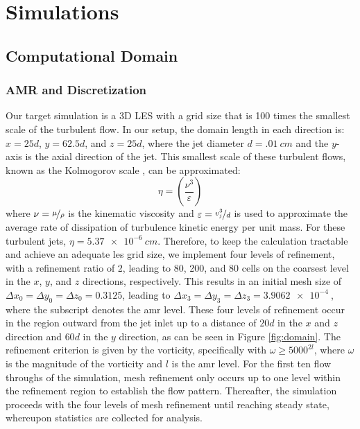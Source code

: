 \chapter{Simulations}


\section{Computational Domain}
\subsection{AMR and Discretization}
Our target simulation is a 3D LES with a grid size that is 100 times the smallest scale of the turbulent flow. In our setup, the domain length in each direction is: $x = 25d$, $y = 62.5d$, and $z = 25d$, where the jet diameter $d=\SI{.01}{cm}$ and the $y$-axis is the axial direction of the jet. This smallest scale of these turbulent flows, known as the Kolmogorov scale \cite{kolmogorov}, can be approximated:
\begin{equation} \label{Kolmogorov}
	\eta = \left( \dfrac{\nu^3}{\varepsilon} \right)
\end{equation}
where $\nu = \nicefrac{\mu}{\rho}$ is the kinematic viscosity and $\varepsilon = \nicefrac{v_j^3}{d}$ is used to approximate the average rate of dissipation of turbulence kinetic energy per unit mass. For these turbulent jets, $\eta = \SI{5.37e-6}{cm}$. Therefore, to keep the calculation tractable and achieve an adequate \gls{les} grid size, we implement four levels of refinement, with a refinement ratio of 2, leading to 80, 200, and 80 cells on the coarsest level in the $x$, $y$, and $z$ directions, respectively. This results in an initial mesh size of $\Delta x_{0}=\Delta y_{0}=\Delta z_{0}=0.3125$, leading to $\Delta x_{3}=\Delta y_{3}=\Delta z_{3}=\SI{3.9062e-4}{}$, where the subscript denotes the \gls{amr} level. These four levels of refinement occur in the region outward from the jet inlet up to a distance of $20d$ in the $x$ and $z$ direction and $60d$ in the $y$ direction, as can be seen in Figure \ref{fig:domain}. The refinement criterion is given by the vorticity, specifically with $\omega \geq 5000^{2l}$, where $\omega$ is the magnitude of the vorticity and $l$ is the \gls{amr} level. For the first ten flow throughs of the simulation, mesh refinement only occurs up to one level within the refinement region to establish the flow pattern. Thereafter, the simulation proceeds  with the four levels of mesh refinement until reaching steady state, whereupon statistics are collected for analysis.
